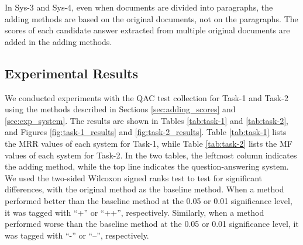 In Sys-3 and Sys-4, 
even when documents are divided into paragraphs, 
the adding methods are based on the original documents, 
not on the paragraphs. 
The scores of each candidate answer
extracted from multiple original documents 
are added in the adding methods. 


\subsection{Experimental Results}
\label{sec:results}

We conducted experiments with the QAC test collection for Task-1 and Task-2
using the methods described in Sections \ref{sec:adding_scores} and \ref{sec:exp_system}. 
The results are shown in Tables \ref{tab:task-1} and \ref{tab:task-2}, and 
Figures \ref{fig:task-1_results} and \ref{fig:task-2_results}. 
Table \ref{tab:task-1} lists the MRR values of each system for Task-1, while
Table \ref{tab:task-2} lists the MF values of each system for Task-2. 
In the two tables, 
the leftmost column indicates the adding method, while
the top line indicates the question-answering system. 
We used the two-sided Wilcoxon signed ranks test to test for significant differences, 
with the original method as the baseline method. 
When a method performed better than the baseline method at the 0.05 or 0.01 significance level, 
it was tagged with ``+'' or ``++'', respectively. 
Similarly, when a method performed worse than the baseline method at the 0.05 or 0.01 significance level, 
it was tagged with ``-'' or ``--'', respectively. 


